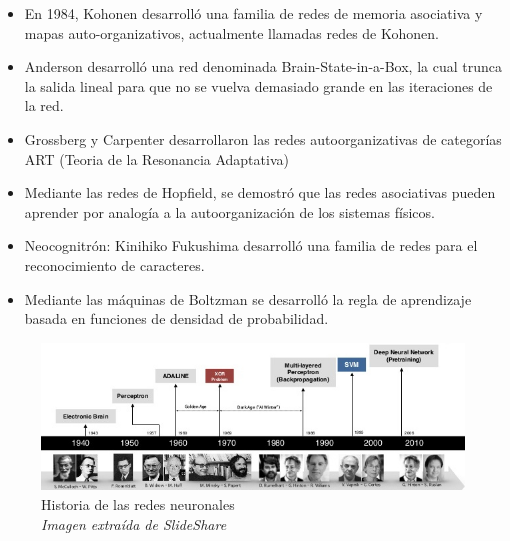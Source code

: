\begin{itemize}
\item En 1984, Kohonen desarrolló una familia de redes de memoria asociativa y mapas auto-organizativos, actualmente llamadas redes de Kohonen.
\item Anderson desarrolló una red denominada Brain-State-in-a-Box, la cual trunca la salida lineal para que no se vuelva demasiado grande en las iteraciones de la red.
\item Grossberg y Carpenter desarrollaron las redes autoorganizativas de categorías ART (Teoria de la Resonancia Adaptativa)
\item Mediante las redes de Hopfield, se demostró que las redes asociativas pueden aprender por analogía a la autoorganización de los sistemas físicos.
\item Neocognitrón: Kinihiko Fukushima desarrolló una familia de redes para el reconocimiento de caracteres.
\item Mediante las máquinas de Boltzman se desarrolló la regla de aprendizaje basada en funciones de densidad de probabilidad.
\end{itemize}

\begin{figure}[htp]
\centering
\includegraphics[scale=0.60]{images/history.jpg}
\caption{Historia de las redes neuronales\\\textit{Imagen extraída de SlideShare}}
\end{figure}

